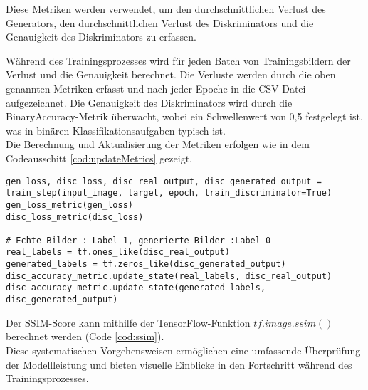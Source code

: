 Diese Metriken werden verwendet, um den durchschnittlichen Verlust des Generators, den durchschnittlichen Verlust des Diskriminators und die Genauigkeit des Diskriminators zu erfassen.

Während des Trainingsprozesses wird für jeden Batch von Trainingsbildern der Verlust und die Genauigkeit berechnet. Die Verluste werden durch die oben genannten Metriken erfasst und nach jeder Epoche in die CSV-Datei aufgezeichnet. Die Genauigkeit des Diskriminators wird durch die BinaryAccuracy-Metrik überwacht, wobei ein Schwellenwert von 0,5 festgelegt ist, was in binären Klassifikationsaufgaben typisch ist.
\\\newline
Die Berechnung und Aktualisierung der Metriken erfolgen wie in dem Codeausschitt \ref{cod:updateMetrics} gezeigt.

\begin{lstlisting}[language=pyhaff, caption={Aktualisierung der Metriken}, label={cod:updateMetrics}]
gen_loss, disc_loss, disc_real_output, disc_generated_output = train_step(input_image, target, epoch, train_discriminator=True)
gen_loss_metric(gen_loss)
disc_loss_metric(disc_loss)

# Echte Bilder : Label 1, generierte Bilder :Label 0
real_labels = tf.ones_like(disc_real_output)
generated_labels = tf.zeros_like(disc_generated_output)
disc_accuracy_metric.update_state(real_labels, disc_real_output)
disc_accuracy_metric.update_state(generated_labels, disc_generated_output)
\end{lstlisting}

Der SSIM-Score kann mithilfe der TensorFlow-Funktion $tf.image.ssim()$ berechnet werden (Code \ref{cod:ssim}).
\\\newline
Diese systematischen Vorgehensweisen ermöglichen eine umfassende Überprüfung der Modellleistung und bieten visuelle Einblicke in den Fortschritt während des Trainingsprozesses.